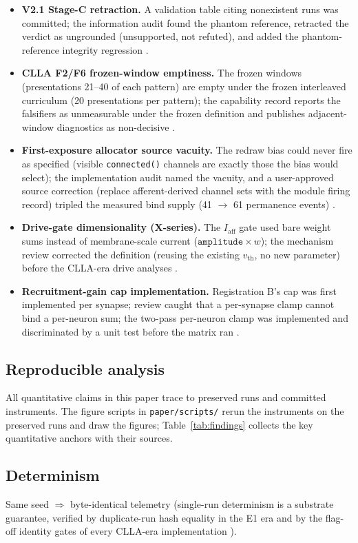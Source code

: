 \begin{itemize}
\item \textbf{V2.1 Stage-C retraction.} A validation table citing
nonexistent runs was committed; the information audit found the
phantom reference, retracted the verdict as ungrounded (unsupported,
not refuted), and added the phantom-reference integrity regression
\cite{infoaudit}.
\item \textbf{CLLA F2/F6 frozen-window emptiness.} The frozen windows
(presentations 21--40 of each pattern) are empty under the frozen
interleaved curriculum (20 presentations per pattern); the capability
record reports the falsifiers as unmeasurable under the frozen
definition and publishes adjacent-window diagnostics as non-decisive
\cite{capability}.
\item \textbf{First-exposure allocator source vacuity.} The redraw
bias could never fire as specified (visible \texttt{connected()}
channels are exactly those the bias would select); the implementation
audit named the vacuity, and a user-approved source correction
(replace afferent-derived channel sets with the module firing record)
tripled the measured bind supply (41 \(\to\) 61 permanence events)
\cite{feimpl,fec}.
\item \textbf{Drive-gate dimensionality (X-series).} The
\(I_{\mathrm{aff}}\) gate used bare weight sums instead of
membrane-scale current (\(\texttt{amplitude}\times w\)); the
mechanism review corrected the definition (reusing the existing
\(v_{\mathrm{th}}\), no new parameter) before the CLLA-era drive
analyses \cite{overview}.
\item \textbf{Recruitment-gain cap implementation.} Registration B's
cap was first implemented per synapse; review caught that a
per-synapse clamp cannot bind a per-neuron sum; the two-pass
per-neuron clamp was implemented and discriminated by a unit test
before the matrix ran \cite{rg8c}.
\end{itemize}

\subsection{Reproducible analysis}

All quantitative claims in this paper trace to preserved runs and
committed instruments. The figure scripts in \texttt{paper/scripts/}
rerun the instruments on the preserved runs and draw the figures;
Table~\ref{tab:findings} collects the key quantitative anchors with
their sources.

\subsection{Determinism}

Same seed \(\Rightarrow\) byte-identical telemetry (single-run
determinism is a substrate guarantee, verified by duplicate-run hash
equality in the E1 era and by the flag-off identity gates of every
CLLA-era implementation \cite{overview,cllarecord}).
